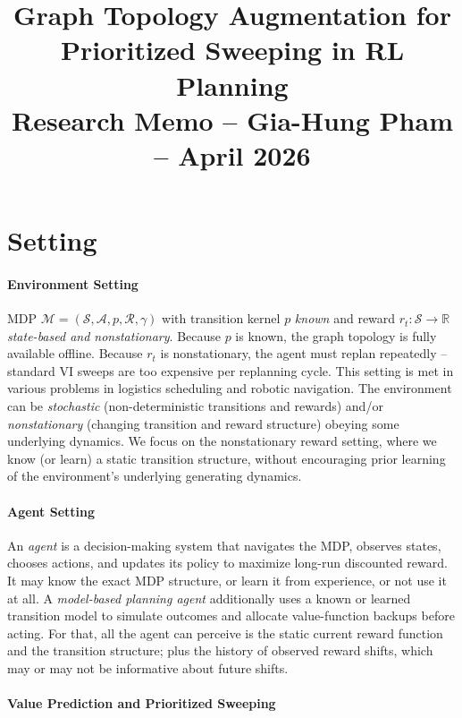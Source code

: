 \documentclass[10pt,a4paper]{article}
\title{\textbf{Graph Topology Augmentation for Prioritized Sweeping in RL Planning}\\[2pt]
\small Research Memo -- Gia-Hung Pham -- April 2026}
\author{}
\date{}
\begin{document}
\maketitle\vspace{-3em}




\section{Setting}

\paragraph{Environment Setting}
MDP $\mathcal{M} = (\mathcal{S}, \mathcal{A}, p, \mathcal{R}, \gamma)$ with transition kernel $p$ \textit{known} and reward $r_t : \mathcal{S} \to \mathbb{R}$ \textit{state-based and nonstationary}. Because $p$ is known, the graph topology is fully available offline. Because $r_t$ is nonstationary, the agent must replan repeatedly -- standard VI sweeps are too expensive per replanning cycle. This setting is met in various problems in logistics scheduling and robotic navigation.
The environment can be \textit{stochastic} (non-deterministic transitions and rewards) and/or \textit{nonstationary} (changing transition and reward structure) obeying some underlying dynamics.
We focus on the nonstationary reward setting, where we know (or learn) a static transition structure, without encouraging prior learning of the environment's underlying generating dynamics.


\paragraph{Agent Setting}
An \textit{agent} is a decision-making system that navigates the MDP, observes states, chooses actions, and updates its policy to maximize long-run discounted reward. It may know the exact MDP structure, or learn it from experience, or not use it at all.
A \textit{model-based planning agent} additionally uses a known or learned transition model to simulate outcomes and allocate value-function backups before acting.
For that, all the agent can perceive is the static current reward function and the transition structure; plus the history of observed reward shifts, which may or may not be informative about future shifts.


\paragraph{Value Prediction and Prioritized Sweeping}
\end{document}
